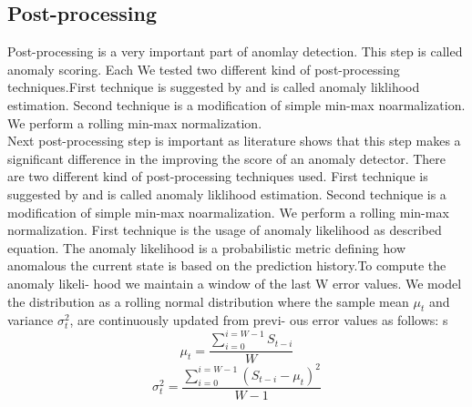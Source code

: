 \documentclass[12pt]{article}
\begin{document}
\subsection{Post-processing}
Post-processing is a very important part of anomlay detection. This step is called anomaly scoring. Each We tested two different kind of post-processing techniques.First technique is suggested by \cite{ahmad2017unsupervised} and is called anomaly liklihood estimation. Second technique is a modification of simple min-max noarmalization. We perform a rolling min-max normalization. \\
\break
Next post-processing step is important as literature shows that this step makes a significant difference in the improving the score of an anomaly detector. There are two different kind of post-processing techniques used. First technique is suggested by \cite{ahmad2017unsupervised} and is called anomaly liklihood estimation. Second technique is a modification of simple min-max noarmalization. We perform a rolling min-max normalization.
First technique is the usage of anomaly likelihood as described equation.
The anomaly likelihood is a probabilistic metric defining how anomalous the current state is based on the prediction history.To compute the anomaly likeli-
hood we maintain a window of the last W error values. We model
the distribution as a rolling normal distribution where the sample
mean $\mu_t$ and variance $\sigma^2_t$, are continuously updated from previ-
ous error values as follows:
s\begin{equation}
\mu_t = \frac{\sum_{i=0}^{i=W-1} S_{t-i}}{W}
\end{equation}
\begin{equation}
\sigma^2_t=\frac{\sum_{i=0}^{i=W-1} (S_{t-i}-\mu_t)^2}{W-1}
\end{equation}
\end{document}
